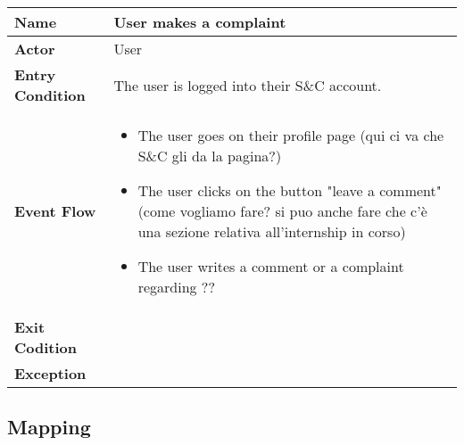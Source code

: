 \begin{longtable}{|p{}|p{}|}
\hline
\textbf{Name} &  User makes a complaint\\
\hline
\textbf{Actor} &  User\\
\hline
\textbf{Entry Condition} &  The user is logged into their S\&C account.\\
\hline
\textbf{Event Flow} &  
\begin{itemize}
    \item The user goes on their profile page (qui ci va che S\&C gli da la pagina?)
    \item The user clicks on the button "leave a comment" (come vogliamo fare? si puo anche fare che c'è una sezione relativa all'internship in corso)
    \item The user writes a comment or a complaint regarding ??
\end{itemize}
\\
\hline
\textbf{Exit Codition} &  \\
\hline
\textbf{Exception} &  \\
\hline
\end{longtable}

\subsection{Mapping}




